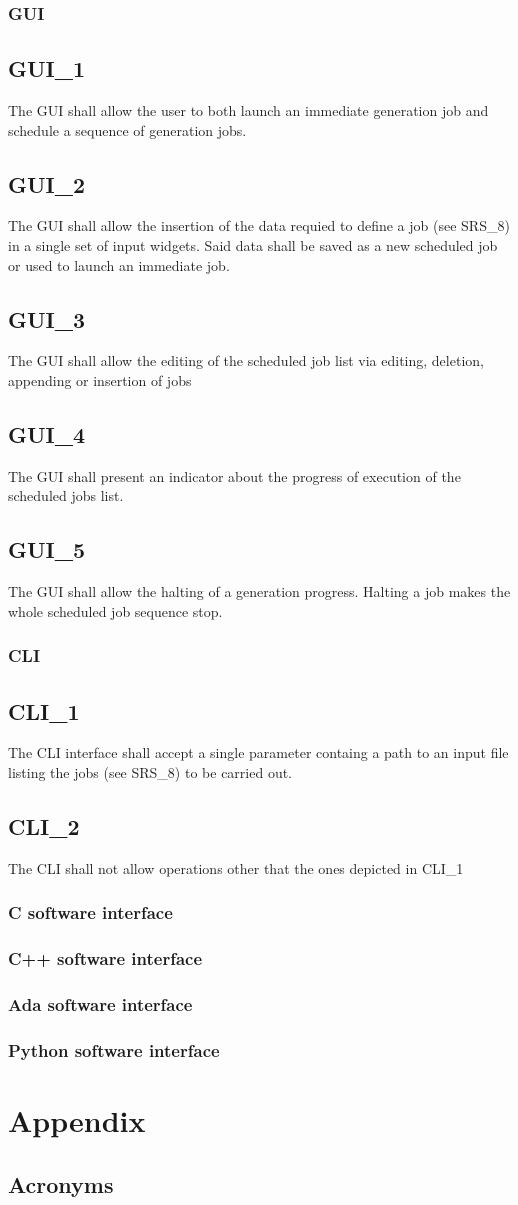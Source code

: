 \documentclass{scrreprt}
\begin{document}
\subsection{GUI}
\setcounter{secnumdepth}{0}
\section{GUI\_1}
The GUI shall allow the user to both launch an immediate generation job and schedule a sequence of generation jobs.
\section{GUI\_2}
The GUI shall allow the insertion of the data requied to define a job (see SRS\_8) in a single set of input widgets. Said data shall be saved as a new scheduled job or used to launch an immediate job.
\section{GUI\_3}
The GUI shall allow the editing of the scheduled job list via editing, deletion, appending or insertion of jobs
\section{GUI\_4}
The GUI shall present an indicator about the progress of execution of the scheduled jobs list.
\section{GUI\_5}
The GUI shall allow the halting of a generation progress. Halting a job makes the whole scheduled job sequence stop.

\subsection{CLI}
\section{CLI\_1}
The CLI interface shall accept a single parameter containg a path to an input file listing the jobs (see SRS\_8) to be carried out.
\section{CLI\_2}
The CLI shall not allow operations other that the ones depicted in CLI\_1
\subsection{C software interface}
\subsection{C++ software interface}
\subsection{Ada software interface}
\subsection{Python software interface}
\chapter{Appendix}
\section{Acronyms}
\end{document}
